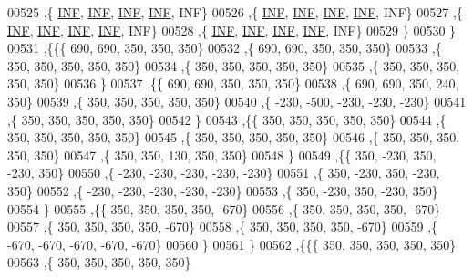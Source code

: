 \begin{DoxyCode}
00525    ,\{   \hyperlink{energy__const_8h_a12c2040f25d8e3a7b9e1c2024c618cb6}{INF},   \hyperlink{energy__const_8h_a12c2040f25d8e3a7b9e1c2024c618cb6}{INF},   \hyperlink{energy__const_8h_a12c2040f25d8e3a7b9e1c2024c618cb6}{INF},   \hyperlink{energy__const_8h_a12c2040f25d8e3a7b9e1c2024c618cb6}{INF},   INF\}
00526    ,\{   \hyperlink{energy__const_8h_a12c2040f25d8e3a7b9e1c2024c618cb6}{INF},   \hyperlink{energy__const_8h_a12c2040f25d8e3a7b9e1c2024c618cb6}{INF},   \hyperlink{energy__const_8h_a12c2040f25d8e3a7b9e1c2024c618cb6}{INF},   \hyperlink{energy__const_8h_a12c2040f25d8e3a7b9e1c2024c618cb6}{INF},   INF\}
00527    ,\{   \hyperlink{energy__const_8h_a12c2040f25d8e3a7b9e1c2024c618cb6}{INF},   \hyperlink{energy__const_8h_a12c2040f25d8e3a7b9e1c2024c618cb6}{INF},   \hyperlink{energy__const_8h_a12c2040f25d8e3a7b9e1c2024c618cb6}{INF},   \hyperlink{energy__const_8h_a12c2040f25d8e3a7b9e1c2024c618cb6}{INF},   INF\}
00528    ,\{   \hyperlink{energy__const_8h_a12c2040f25d8e3a7b9e1c2024c618cb6}{INF},   \hyperlink{energy__const_8h_a12c2040f25d8e3a7b9e1c2024c618cb6}{INF},   \hyperlink{energy__const_8h_a12c2040f25d8e3a7b9e1c2024c618cb6}{INF},   \hyperlink{energy__const_8h_a12c2040f25d8e3a7b9e1c2024c618cb6}{INF},   INF\}
00529    \}
00530   \}
00531  ,\{\{\{   690,   690,   350,   350,   350\}
00532    ,\{   690,   690,   350,   350,   350\}
00533    ,\{   350,   350,   350,   350,   350\}
00534    ,\{   350,   350,   350,   350,   350\}
00535    ,\{   350,   350,   350,   350,   350\}
00536    \}
00537   ,\{\{   690,   690,   350,   350,   350\}
00538    ,\{   690,   690,   350,   240,   350\}
00539    ,\{   350,   350,   350,   350,   350\}
00540    ,\{  -230,  -500,  -230,  -230,  -230\}
00541    ,\{   350,   350,   350,   350,   350\}
00542    \}
00543   ,\{\{   350,   350,   350,   350,   350\}
00544    ,\{   350,   350,   350,   350,   350\}
00545    ,\{   350,   350,   350,   350,   350\}
00546    ,\{   350,   350,   350,   350,   350\}
00547    ,\{   350,   350,   130,   350,   350\}
00548    \}
00549   ,\{\{   350,  -230,   350,  -230,   350\}
00550    ,\{  -230,  -230,  -230,  -230,  -230\}
00551    ,\{   350,  -230,   350,  -230,   350\}
00552    ,\{  -230,  -230,  -230,  -230,  -230\}
00553    ,\{   350,  -230,   350,  -230,   350\}
00554    \}
00555   ,\{\{   350,   350,   350,   350,  -670\}
00556    ,\{   350,   350,   350,   350,  -670\}
00557    ,\{   350,   350,   350,   350,  -670\}
00558    ,\{   350,   350,   350,   350,  -670\}
00559    ,\{  -670,  -670,  -670,  -670,  -670\}
00560    \}
00561   \}
00562  ,\{\{\{   350,   350,   350,   350,   350\}
00563    ,\{   350,   350,   350,   350,   350\}

\end{DoxyCode}
